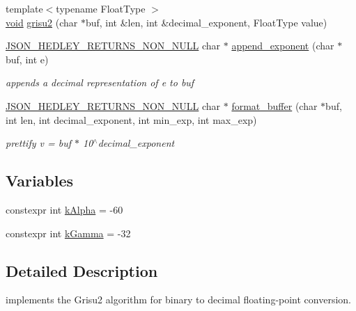 \begin{DoxyCompactItemize}
\item 
{\footnotesize template$<$typename Float\+Type $>$ }\\\mbox{\hyperlink{namespacenlohmann_1_1detail_a59fca69799f6b9e366710cb9043aa77d}{void}} \mbox{\hyperlink{namespacenlohmann_1_1detail_1_1dtoa__impl_aab7a9670a4f4704a5d0347ad7588576b}{grisu2}} (char $\ast$buf, int \&len, int \&decimal\+\_\+exponent, Float\+Type value)
\item 
\mbox{\hyperlink{json_8hpp_a5f2aaec3b681d0a72f7d6e90b70cdcd1}{J\+S\+O\+N\+\_\+\+H\+E\+D\+L\+E\+Y\+\_\+\+R\+E\+T\+U\+R\+N\+S\+\_\+\+N\+O\+N\+\_\+\+N\+U\+LL}} char $\ast$ \mbox{\hyperlink{namespacenlohmann_1_1detail_1_1dtoa__impl_ad90f19ed10d8133b727df4b9bc5ddf5c}{append\+\_\+exponent}} (char $\ast$buf, int e)
\begin{DoxyCompactList}\small\item\em appends a decimal representation of e to buf \end{DoxyCompactList}\item 
\mbox{\hyperlink{json_8hpp_a5f2aaec3b681d0a72f7d6e90b70cdcd1}{J\+S\+O\+N\+\_\+\+H\+E\+D\+L\+E\+Y\+\_\+\+R\+E\+T\+U\+R\+N\+S\+\_\+\+N\+O\+N\+\_\+\+N\+U\+LL}} char $\ast$ \mbox{\hyperlink{namespacenlohmann_1_1detail_1_1dtoa__impl_ab441f2761e33839ca48bc2225e14a2a9}{format\+\_\+buffer}} (char $\ast$buf, int len, int decimal\+\_\+exponent, int min\+\_\+exp, int max\+\_\+exp)
\begin{DoxyCompactList}\small\item\em prettify v = buf $\ast$ 10$^\wedge$decimal\+\_\+exponent \end{DoxyCompactList}\end{DoxyCompactItemize}
\subsection*{Variables}
\begin{DoxyCompactItemize}
\item 
constexpr int \mbox{\hyperlink{namespacenlohmann_1_1detail_1_1dtoa__impl_ac1ea1316de0b4a219f707c76b1db1966}{k\+Alpha}} = -\/60
\item 
constexpr int \mbox{\hyperlink{namespacenlohmann_1_1detail_1_1dtoa__impl_a4a750fcc38da1ce68b7e25ab3a230e20}{k\+Gamma}} = -\/32
\end{DoxyCompactItemize}


\subsection{Detailed Description}
implements the Grisu2 algorithm for binary to decimal floating-\/point conversion. 

